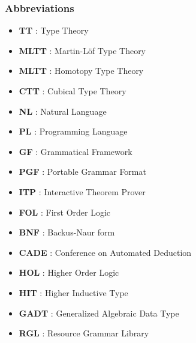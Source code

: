 \documentclass[9pt]{beamer}
\begin{document}
\begin{frame}
\frametitle{Abbreviations}
\begin{itemize}
\item \textbf{TT} : Type Theory
\item \textbf{MLTT} : Martin-Löf Type Theory
\item \textbf{MLTT} : Homotopy Type Theory
\item \textbf{CTT} : Cubical Type Theory
\item \textbf{NL} : Natural Language
\item \textbf{PL} : Programming Language
\item \textbf{GF} : Grammatical Framework
\item \textbf{PGF} : Portable Grammar Format
\item \textbf{ITP} : Interactive Theorem Prover
\item \textbf{FOL} : First Order Logic
\item \textbf{BNF} : Backus-Naur form
\item \textbf{CADE} : Conference on Automated Deduction
\item \textbf{HOL} : Higher Order Logic
\item \textbf{HIT} : Higher Inductive Type
\item \textbf{GADT} : Generalized Algebraic Data Type
\item \textbf{RGL} : Resource Grammar Library
\end{itemize}
\end{frame}
\end{document}
